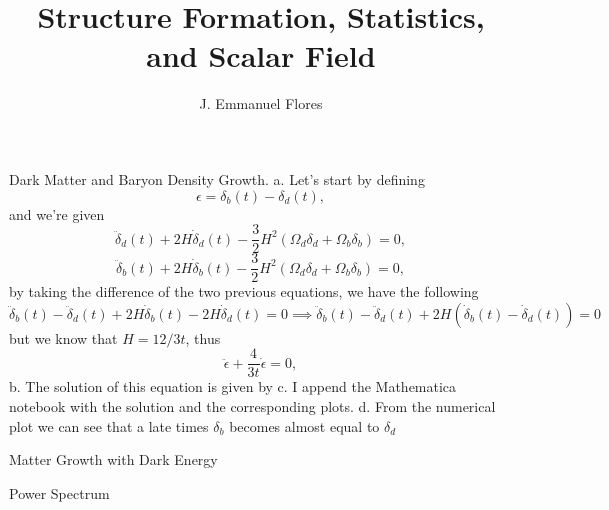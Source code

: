 \documentclass[11pt]{article}
\title{Structure Formation, Statistics, and Scalar Field}
\author{J. Emmanuel Flores}
\begin{document}
\maketitle
\begin{problem}
Dark Matter and Baryon Density Growth.
\newline
a. Let's start by defining 
\begin{displaymath}
  \epsilon = \delta_b(t) - \delta_d(t),
\end{displaymath}
and we're given
\begin{displaymath}
  \ddot\delta_d(t) + 2H\dot\delta_d(t) - \frac{3}{2}H^2(\Omega_d\delta_d +\Omega_b\delta_b)=0,
\end{displaymath}
\begin{displaymath}
  \ddot\delta_b(t) + 2H\dot\delta_b(t) - \frac{3}{2}H^2(\Omega_d\delta_d +\Omega_b\delta_b)=0,
\end{displaymath}
by taking the difference of the two previous equations, we have the following
\begin{displaymath}
  \ddot\delta_b(t)-\ddot\delta_d(t) + 2H\dot\delta_b(t) -2H\dot\delta_d(t)=0\implies \ddot\delta_b(t)-\ddot\delta_d(t) + 2H(\dot\delta_b(t) -\dot\delta_d(t))=0
\end{displaymath}
but we know that $H=12/3t$, thus
\begin{displaymath}
\ddot{\epsilon} + \frac{4}{3t}\dot{\epsilon}=0,
\end{displaymath}
\newline
b. The solution of this equation is given by
\newline
c. I append the Mathematica notebook with the solution and the corresponding plots.
\newline
d. From the numerical plot we can see that a late times $\delta_{b}$ becomes almost equal to $\delta_{d}$
\end{problem}
\newpage

\begin{problem}
Matter Growth with Dark Energy
\newline
\end{problem}
\newpage

\begin{problem}
Power Spectrum
\end{problem}
\newpage
\end{document}
